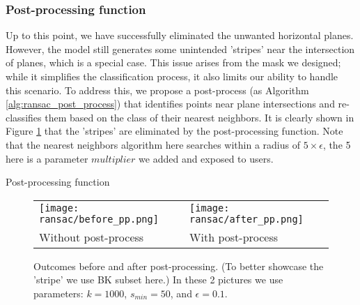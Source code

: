 \documentclass[a4paper,9pt]{article}
\begin{document}
\subsubsection{Post-processing function}
Up to this point, we have successfully eliminated the unwanted horizontal planes. However, the model still generates some unintended 'stripes' near the intersection of planes, which is a special case. This issue arises from the mask we designed; while it simplifies the classification process, it also limits our ability to handle this scenario. To address this, we propose a post-process (as Algorithm \ref{alg:ransac_post_process}) that identifies points near plane intersections and re-classifies them based on the class of their nearest neighbors. It is clearly shown in Figure \ref{fig:ransac_post_process} that the 'stripes' are eliminated by the post-processing function. Note that the nearest neighbors algorithm here searches within a radius of $5\times\epsilon$, the 5 here is a parameter $multiplier$ we added and exposed to users.

\begin{algorithm}[H]
\caption{Post-processing function}
\label{alg:ransac_post_process}

\end{algorithm}

\begin{figure}[H]
    \begin{tabularx}{\textwidth}{XX}
        \texttt{[image: ransac/before\_pp.png]} &
        \texttt{[image: ransac/after\_pp.png]} \\
        Without post-process & With post-process
    \end{tabularx}
    \caption{Outcomes before and after post-processing. (To better showcase the 'stripe' we use BK subset here.) In these 2 pictures we use parameters: $k=1000$, $s_{min}=50$, and $\epsilon=0.1$.}
    \label{fig:ransac_post_process}
\end{figure}
\end{document}
